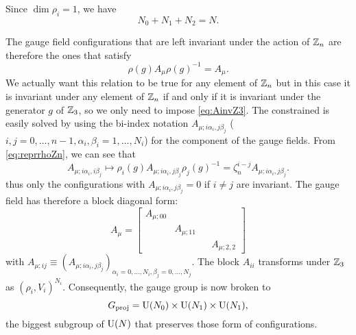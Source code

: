 \documentclass[a4paper,10pt]{article}
\begin{document}
            Since $\dim\rho_i=1$, we have
            \begin{equation}
                N_0+N_1+N_2=N.\label{eq:sumNiZ3}
            \end{equation} 
            
            The gauge field configurations that are left invariant under the action of $\mathbb{Z}_n$ are therefore the ones that satisfy
            \begin{equation}
                \rho(g)A_\mu\rho(g)^{-1}=A_\mu.\label{eq:AinvZ3}
            \end{equation}
            We actually want this relation to be true for any element of $\mathbb{Z}_n$ but in this case it is invariant under any element of $\mathbb{Z}_n$ if and only if it is invariant under the generator $g$ of $\mathbb{Z}_3$, so we only need to impose \eqref{eq:AinvZ3}. The constrained is easily solved by using the bi-index notation $A_{\mu;i\alpha_i,j\beta_j}$ ($i,j=0,\dots,n-1,\alpha_i,\beta_i=1,\dots,N_i$) for the component of the gauge fields. From \eqref{eq:reprrhoZn}, we can see that
            \begin{equation}
                A_{\mu;i\alpha_i,i\beta_j}\mapsto \rho_i(g)A_{\mu;i\alpha_i,j\beta_j}\rho_j(g)^{-1}=\zeta^{i-j}_nA_{\mu;i\alpha_i,j\beta_j}.
            \end{equation}
            thus only the configurations with $A_{\mu;i\alpha_i,j\beta_j}=0$ if $i\neq j$ are invariant. The gauge field has therefore a block diagonal form:
            \begin{equation}
                A_\mu=
                \begin{bmatrix}
                    A_{\mu;00} & & \\
                    & A_{\mu;11} & \\
                    & & & A_{\mu;2,2}
                \end{bmatrix}
            \end{equation}
            with $A_{\mu;ij}\equiv (A_{\mu;i\alpha_i,j\beta_j})_{\alpha_i=0,\dots,N_i,\beta_j=0,\dots,N_j}$. The block $A_{ii}$ transforms under $\mathbb{Z}_3$ as $(\rho_i,V_i)^{N_i}$.
            Consequently, the gauge group is now broken to
            \begin{equation}
                G_{\text{proj}}=\text{U}(N_0)\times\text{U}(N_1)\times\text{U}(N_1),
            \end{equation}
            the biggest subgroup of $\text{U}(N)$ that preserves those form of configurations.
            
\end{document}
